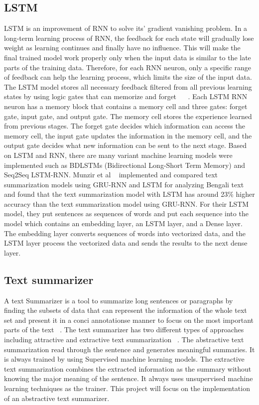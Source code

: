 \documentclass[conference]{IEEEtran}
\begin{document}
\subsection{LSTM}
LSTM is an improvement of RNN to solve its’ gradient vanishing problem. In a long-term learning process of RNN, the feedback for each state will gradually lose weight as learning continues and finally have no influence. This will make the final trained model work properly only when the input data is similar to the late parts of the training data. Therefore, for each RNN neuron, only a specific range of feedback can help the learning process, which limits the size of the input data. The LSTM model stores all necessary feedback filtered from all previous learning states by using logic gates that can memorize and forget ~\cite{hochreiter1997long} ~\cite{gers2000learning}. Each LSTM RNN neuron has a memory block that contains a memory cell and three gates: forget gate, input gate, and output gate. The memory cell stores the experience learned from previous stages. The forget gate decides which information can access the memory cell, the input gate updates the information in the memory cell, and the output gate decides what new information can be sent to the next stage. Based on LSTM and RNN, there are many variant machine learning models were implemented such as BDLSTMs (Bidirectional Long-Short Term Memory) and Seq2Seq LSTM-RNN. Munzir et al ~\cite{Munzir2019} implemented and compared text summarization models using GRU-RNN and LSTM for analyzing Bengali text and found that the text summarization model with LSTM has around 23\% higher accuracy than the text summarization model using GRU-RNN. For their LSTM model, they put sentences as sequences of words and put each sequence into the model which contains an embedding layer, an LSTM layer, and a Dense layer. The embedding layer converts sequences of words into vectorized data, and the LSTM layer process the vectorized data and sends the results to the next dense layer. 
\subsection{Text summarizer}
A text Summarizer is a tool to summarize long sentences or paragraphs by finding the subsets of data that can represent the information of the whole text set and present it in a conci annotationse manner to focus on the most important parts of the text ~\cite{sinha2018extractive}. The text summarizer has two different types of approaches including attractive and extractive text summarization ~\cite{pai2014}. The abstractive text summarization read through the sentence and generates meaningful summaries. It is always trained by using Supervised machine learning models. The extractive text summarization combines the extracted information as the summary without knowing the major meaning of the sentence. It always uses unsupervised machine learning techniques as the trainer. This project will focus on the implementation of an abstractive text summarizer.
\end{document}
